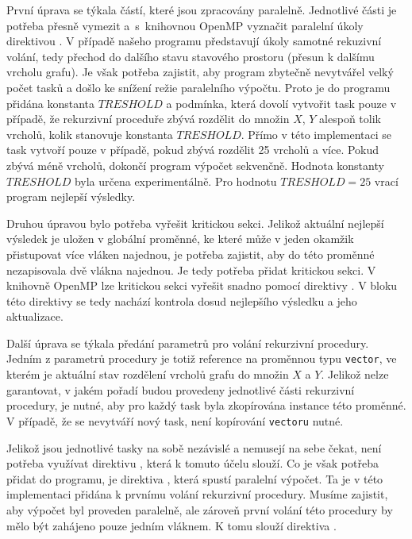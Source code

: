 \documentclass{article}
\begin{document}
První úprava se týkala částí, které jsou zpracovány paralelně. Jednotlivé části je potřeba přesně vymezit a~s~knihovnou OpenMP vyznačit paralelní úkoly direktivou . V případě našeho programu představují úkoly samotné rekuzivní volání, tedy přechod do dalšího stavu stavového prostoru (přesun k dalšímu vrcholu grafu). Je však potřeba zajistit, aby program zbytečně nevytvářel velký počet tasků a došlo ke snížení režie paralelního výpočtu. Proto je do programu přidána konstanta $TRESHOLD$ a podmínka, která dovolí vytvořit  task pouze v případě, že rekurzivní proceduře zbývá rozdělit do množin $X$, $Y$ alespoň tolik vrcholů, kolik stanovuje konstanta $TRESHOLD$. Přímo v této implementaci se task vytvoří pouze v případě, pokud zbývá rozdělit 25 vrcholů a více. Pokud zbývá méně vrcholů, dokončí program výpočet sekvenčně. Hodnota konstanty $TRESHOLD$ byla určena experimentálně. Pro hodnotu $TRESHOLD = 25$ vrací program nejlepší výsledky.

Druhou úpravou bylo potřeba vyřešit kritickou sekci. Jelikož aktuální nejlepší výsledek je uložen v globální proměnné, ke které může v jeden okamžik přistupovat více vláken najednou, je potřeba zajistit, aby do této proměnné nezapisovala dvě vlákna najednou. Je tedy potřeba přidat kritickou sekci. V knihovně OpenMP lze kritickou sekci vyřešit snadno pomocí direktivy . V bloku této direktivy se tedy nachází kontrola dosud nejlepšího výsledku a jeho aktualizace.

Další úprava se týkala předání parametrů pro volání rekurzivní procedury. Jedním z parametrů procedury je totiž reference na proměnnou typu \texttt{vector}, ve kterém je aktuální stav rozdělení vrcholů grafu do množin $X$ a $Y$. Jelikož nelze garantovat, v jakém pořadí budou provedeny jednotlivé části rekurzivní procedury, je nutné, aby pro každý task byla zkopírována instance této proměnné. V případě, že se nevytváří nový task, není kopírování \texttt{vectoru} nutné.

Jelikož jsou jednotlivé tasky na sobě nezávislé a nemusejí na sebe čekat, není potřeba využívat direktivu , která k tomuto účelu slouží. Co je však potřeba přidat do programu, je direktiva , která spustí paralelní výpočet. Ta je v této implementaci přidána k prvnímu volání rekurzivní procedury. Musíme zajistit, aby výpočet byl proveden paralelně, ale zároveň první volání této procedury by mělo být zahájeno pouze jedním vláknem. K tomu slouží direktiva .
\end{document}
